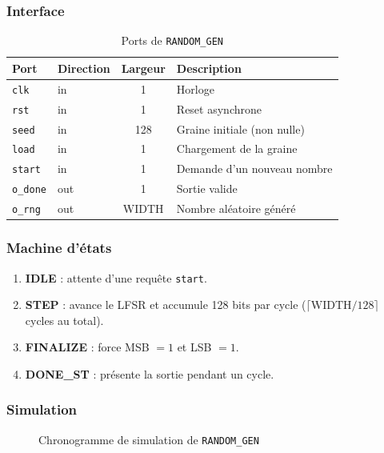 \subsubsection{Interface}
\begin{table}[H]
\centering
\caption{Ports de \texttt{RANDOM\_GEN}}
\begin{tabular}{llcp{5cm}}
\toprule
\textbf{Port} & \textbf{Direction} & \textbf{Largeur} & \textbf{Description} \\
\midrule
\texttt{clk}    & in  & 1   & Horloge \\
\texttt{rst}    & in  & 1   & Reset asynchrone \\
\texttt{seed}   & in  & 128 & Graine initiale (non nulle) \\
\texttt{load}   & in  & 1   & Chargement de la graine \\
\texttt{start}  & in  & 1   & Demande d'un nouveau nombre \\
\texttt{o\_done} & out & 1   & Sortie valide \\
\texttt{o\_rng}  & out & WIDTH & Nombre aléatoire généré \\
\bottomrule
\end{tabular}
\end{table}


\subsubsection{Machine d'états}
\begin{enumerate}
  \item \textbf{IDLE} : attente d'une requête \texttt{start}.
  \item \textbf{STEP} : avance le LFSR et accumule 128 bits par cycle
        ($\lceil\text{WIDTH}/128\rceil$ cycles au total).
  \item \textbf{FINALIZE} : force MSB $= 1$ et LSB $= 1$.
  \item \textbf{DONE\_ST} : présente la sortie pendant un cycle.
\end{enumerate}

\subsubsection{Simulation}
\begin{figure}[H]
\centering
\caption{Chronogramme de simulation de \texttt{RANDOM\_GEN}}
\label{fig:sim_rng}
\end{figure}

